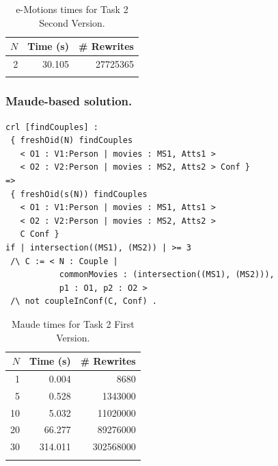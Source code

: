\begin{table}
  \begin{center}
	\begin{tabular}{r r r}
	$N$ & Time (s) & \# Rewrites \\
	\hline
	2 & 30.105 & 27725365 \\
	\hline \\
	\end{tabular}
	\caption{e-Motions times for Task 2 Second Version.}\label{table:emotionstask1}
	\end{center}
\end{table}


\subsubsection{Maude-based solution.}


\begin{lstlisting}[caption=\code{createCouples} Maude rule., label=lst:oneRuleCouples]
crl [findCouples] :
 { freshOid(N) findCouples
   < O1 : V1:Person | movies : MS1, Atts1 >
   < O2 : V2:Person | movies : MS2, Atts2 > Conf }
=>
 { freshOid(s(N)) findCouples
   < O1 : V1:Person | movies : MS1, Atts1 >
   < O2 : V2:Person | movies : MS2, Atts2 >
   C Conf }
if | intersection((MS1), (MS2)) | >= 3
 /\ C := < N : Couple | 
           commonMovies : (intersection((MS1), (MS2))),
           p1 : O1, p2 : O2 >
 /\ not coupleInConf(C, Conf) .
\end{lstlisting}

\begin{table}
  \begin{center}
	\begin{tabular}{r r r}
	$N$ & Time (s) & \# Rewrites \\
	\hline
	1 & 0.004 & 8680 \\
	5 & 0.528 & 1343000 \\
	10 & 5.032 & 11020000 \\
	20 & 66.277 & 89276000 \\
	30 & 314.011 & 302568000 \\
	\hline \\
	\end{tabular}
	\caption{Maude times for Task 2 First Version.}\label{table:emotionstask1}
	\end{center}
\end{table}

